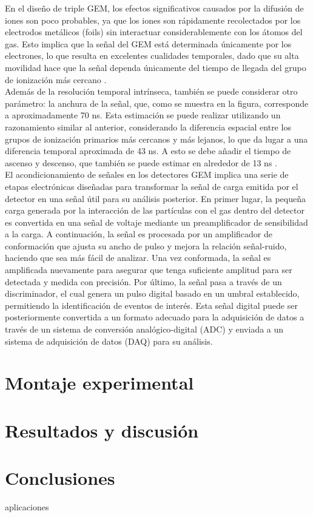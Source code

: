 \documentclass{article}
\begin{document}
\noindent En el diseño de triple GEM, los efectos significativos causados por la difusión de iones son poco probables, ya que los iones son rápidamente recolectados por los electrodos metálicos (foils) sin interactuar considerablemente con los átomos del gas. Esto implica que la señal del GEM está determinada únicamente por los electrones, lo que resulta en excelentes cualidades temporales, dado que su alta movilidad hace que la señal dependa únicamente del tiempo de llegada del grupo de ionización más cercano \cite{mocellin2021performance}.\\

\noindent Además de la resolución temporal intrínseca, también se puede considerar otro parámetro: la anchura de la señal, que, como se muestra en la figura, corresponde a aproximadamente 70 ns. Esta estimación se puede realizar utilizando un razonamiento similar al anterior, considerando la diferencia espacial entre los grupos de ionización primarios más cercanos y más lejanos, lo que da lugar a una diferencia temporal aproximada de 43 ns. A esto se debe añadir el tiempo de ascenso y descenso, que también se puede estimar en alrededor de 13 ns \cite{mocellin2021performance}.\\

\noindent El acondicionamiento de señales en los detectores GEM implica una serie de etapas electrónicas diseñadas para transformar la señal de carga emitida por el detector en una señal útil para su análisis posterior. En primer lugar, la pequeña carga generada por la interacción de las partículas con el gas dentro del detector es convertida en una señal de voltaje mediante un preamplificador de sensibilidad a la carga. A continuación, la señal es procesada por un amplificador de conformación que ajusta su ancho de pulso y mejora la relación señal-ruido, haciendo que sea más fácil de analizar. Una vez conformada, la señal es amplificada nuevamente para asegurar que tenga suficiente amplitud para ser detectada y medida con precisión. Por último, la señal pasa a través de un discriminador, el cual genera un pulso digital basado en un umbral establecido, permitiendo la identificación de eventos de interés. Esta señal digital puede ser posteriormente convertida a un formato adecuado para la adquisición de datos a través de un sistema de conversión analógico-digital (ADC) y enviada a un sistema de adquisición de datos (DAQ) para su análisis.
\newpage

\section{Montaje experimental}
\newpage

\section{Resultados y discusión}
\newpage

\section{Conclusiones}
\newpage



\noindent aplicaciones


\newpage



\end{document}
